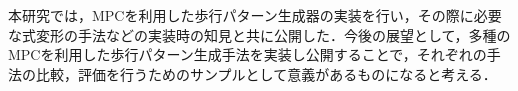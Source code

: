 
本研究では，MPCを利用した歩行パターン生成器の実装を行い，その際に必要な式変形の手法などの実装時の知見と共に公開した．今後の展望として，多種のMPCを利用した歩行パターン生成手法を実装し公開することで，それぞれの手法の比較，評価を行うためのサンプルとして意義があるものになると考える．